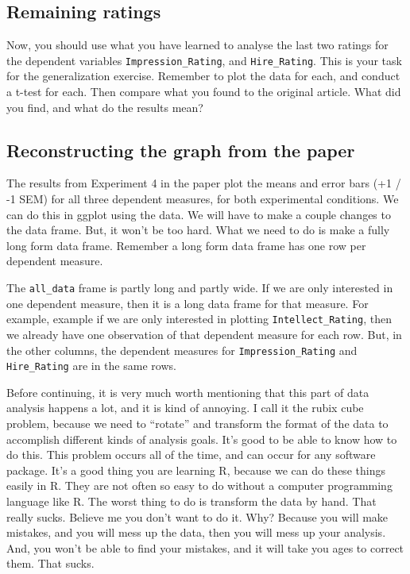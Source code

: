 \documentclass[
]{book}
\begin{document}
\hypertarget{remaining-ratings}{%
\subsection{Remaining ratings}\label{remaining-ratings}}

Now, you should use what you have learned to analyse the last two ratings for the dependent variables \texttt{Impression\_Rating}, and \texttt{Hire\_Rating}. This is your task for the generalization exercise. Remember to plot the data for each, and conduct a t-test for each. Then compare what you found to the original article. What did you find, and what do the results mean?

\hypertarget{reconstructing-the-graph-from-the-paper}{%
\subsection{Reconstructing the graph from the paper}\label{reconstructing-the-graph-from-the-paper}}

The results from Experiment 4 in the paper plot the means and error bars (+1 / -1 SEM) for all three dependent measures, for both experimental conditions. We can do this in ggplot using the data. We will have to make a couple changes to the data frame. But, it won't be too hard. What we need to do is make a fully long form data frame. Remember a long form data frame has one row per dependent measure.

The \texttt{all\_data} frame is partly long and partly wide. If we are only interested in one dependent measure, then it is a long data frame for that measure. For example, example if we are only interested in plotting \texttt{Intellect\_Rating}, then we already have one observation of that dependent measure for each row. But, in the other columns, the dependent measures for \texttt{Impression\_Rating} and \texttt{Hire\_Rating} are in the same rows.

Before continuing, it is very much worth mentioning that this part of data analysis happens a lot, and it is kind of annoying. I call it the rubix cube problem, because we need to ``rotate'' and transform the format of the data to accomplish different kinds of analysis goals. It's good to be able to know how to do this. This problem occurs all of the time, and can occur for any software package. It's a good thing you are learning R, because we can do these things easily in R. They are not often so easy to do without a computer programming language like R. The worst thing to do is transform the data by hand. That really sucks. Believe me you don't want to do it. Why? Because you will make mistakes, and you will mess up the data, then you will mess up your analysis. And, you won't be able to find your mistakes, and it will take you ages to correct them. That sucks.
\end{document}
